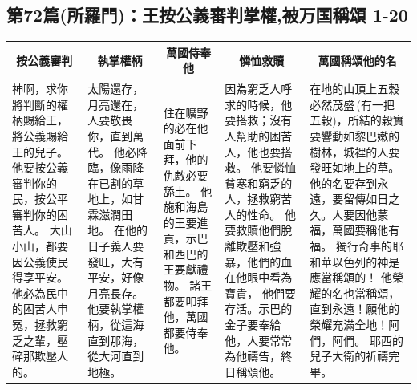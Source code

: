 \subsection{第72篇(所羅門)：王按公義審判掌權,被万国稱頌 1-20}
\begin{table}[H]
\centering
\begin{tabular}{p{8.5em}|p{8.2em}|p{5.67em}|p{10.3em}|p{13.6em}}\hline\hline
\multicolumn{1}{c|}{按公義審判}&\multicolumn{1}{c|}{執掌權柄}&\multicolumn{1}{c|}{萬國侍奉他}&\multicolumn{1}{c|}{憐恤救贖}&\multicolumn{1}{c}{萬國稱頌他的名}\\\hline
神啊，求你將判斷的權柄賜給王，將公義賜給王的兒子。
他要按公義審判你的民，按公平審判你的困苦人。
大山小山，都要因公義使民得享平安。
他必為民中的困苦人申冤，拯救窮乏之輩，壓碎那欺壓人的。
&太陽還存，月亮還在，人要敬畏你，直到萬代。
他必降臨，像雨降在已割的草地上，如甘霖滋潤田地。
在他的日子義人要發旺，大有平安，好像月亮長存。
他要執掌權柄，從這海直到那海，從大河直到地極。
&住在曠野的必在他面前下拜，他的仇敵必要舔土。
他施和海島的王要進貢，示巴和西巴的王要獻禮物。
諸王都要叩拜他，萬國都要侍奉他。
&因為窮乏人呼求的時候，他要搭救；沒有人幫助的困苦人，他也要搭救。
他要憐恤貧寒和窮乏的人，拯救窮苦人的性命。
他要救贖他們脫離欺壓和強暴，他們的血在他眼中看為寶貴，
他們要存活。示巴的金子要奉給他，人要常常為他禱告，終日稱頌他。
&在地的山頂上五穀必然茂盛 (有一把五穀)，所結的穀實要響動如黎巴嫩的樹林，城裡的人要發旺如地上的草。
他的名要存到永遠，要留傳如日之久。人要因他蒙福，萬國要稱他有福。
獨行奇事的耶和華以色列的神是應當稱頌的！
他榮耀的名也當稱頌，直到永遠！願他的榮耀充滿全地！阿們，阿們。
耶西的兒子大衛的祈禱完畢。\\\hline
\end{tabular}
\end{table} 


